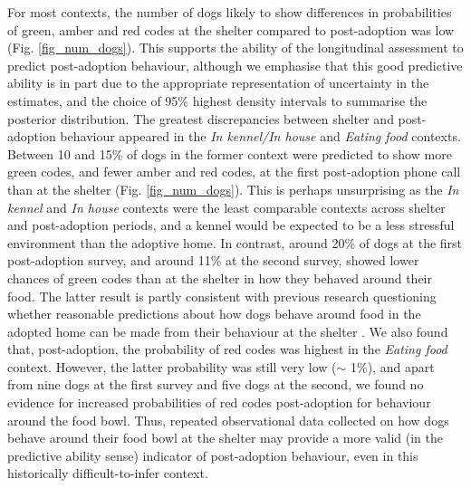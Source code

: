 \documentclass[fleqn,10pt]{wlscirep}
\begin{document}
For most contexts, the number of dogs likely to show differences in probabilities of green, amber and red codes at the shelter compared to post-adoption was low (Fig. \ref{fig_num_dogs}). This supports the ability of the longitudinal assessment to predict post-adoption behaviour, although we emphasise that this good predictive ability is in part due to the appropriate representation of uncertainty in the estimates, and the choice of 95\% highest density intervals to summarise the posterior distribution. The greatest discrepancies between shelter and post-adoption behaviour appeared in the \textit{In kennel/In house} and \textit{Eating food} contexts. Between 10 and 15\% of dogs in the former context were predicted to show more green codes, and fewer amber and red codes, at the first post-adoption phone call than at the shelter (Fig. \ref{fig_num_dogs}). This is perhaps unsurprising as the \textit{In kennel} and \textit{In house} contexts were the least comparable contexts across shelter and post-adoption periods, and a kennel would be expected to be a less stressful environment than the adoptive home. In contrast, around 20\% of dogs at the first post-adoption survey, and around 11\% at the second survey, showed lower chances of green codes than at the shelter in how they behaved around their food. The latter result is partly consistent with previous research questioning whether reasonable predictions about how dogs behave around food in the adopted home can be made from their behaviour at the shelter \cite{marder2013,mohangibbons2012,clay2020behaviour}. We also found that, post-adoption, the probability of red codes was highest in the \textit{Eating food} context. However, the latter probability was still very low ($\sim$ 1\%), and apart from nine dogs at the first survey and five dogs at the second, we found no evidence for increased probabilities of red codes post-adoption for behaviour around the food bowl. Thus, repeated observational data collected on how dogs behave around their food bowl at the shelter may provide a more valid (in the predictive ability sense) indicator of post-adoption behaviour, even in this historically difficult-to-infer context.
\end{document}
